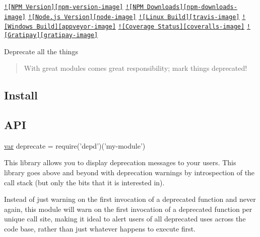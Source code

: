 \href{https://npmjs.org/package/depd}{\tt !\mbox{[}N\+P\+M Version\mbox{]}\mbox{[}npm-\/version-\/image\mbox{]}} \href{https://npmjs.org/package/depd}{\tt !\mbox{[}N\+P\+M Downloads\mbox{]}\mbox{[}npm-\/downloads-\/image\mbox{]}} \href{http://nodejs.org/download/}{\tt !\mbox{[}Node.\+js Version\mbox{]}\mbox{[}node-\/image\mbox{]}} \href{https://travis-ci.org/dougwilson/nodejs-depd}{\tt !\mbox{[}Linux Build\mbox{]}\mbox{[}travis-\/image\mbox{]}} \href{https://ci.appveyor.com/project/dougwilson/nodejs-depd}{\tt !\mbox{[}Windows Build\mbox{]}\mbox{[}appveyor-\/image\mbox{]}} \href{https://coveralls.io/r/dougwilson/nodejs-depd?branch=master}{\tt !\mbox{[}Coverage Status\mbox{]}\mbox{[}coveralls-\/image\mbox{]}} \href{https://www.gratipay.com/dougwilson/}{\tt !\mbox{[}Gratipay\mbox{]}\mbox{[}gratipay-\/image\mbox{]}}

Deprecate all the things

\begin{quote}
With great modules comes great responsibility; mark things deprecated! \end{quote}


\subsection*{Install}




\subsection*{A\+P\+I}


\begin{DoxyCode}
\hyperlink{018__def_8c_a335628f2e9085305224b4f9cc6e95ed5}{var} deprecate = require(\textcolor{stringliteral}{'depd'})(\textcolor{stringliteral}{'my-module'})
\end{DoxyCode}


This library allows you to display deprecation messages to your users. This library goes above and beyond with deprecation warnings by introspection of the call stack (but only the bits that it is interested in).

Instead of just warning on the first invocation of a deprecated function and never again, this module will warn on the first invocation of a deprecated function per unique call site, making it ideal to alert users of all deprecated uses across the code base, rather than just whatever happens to execute first.

